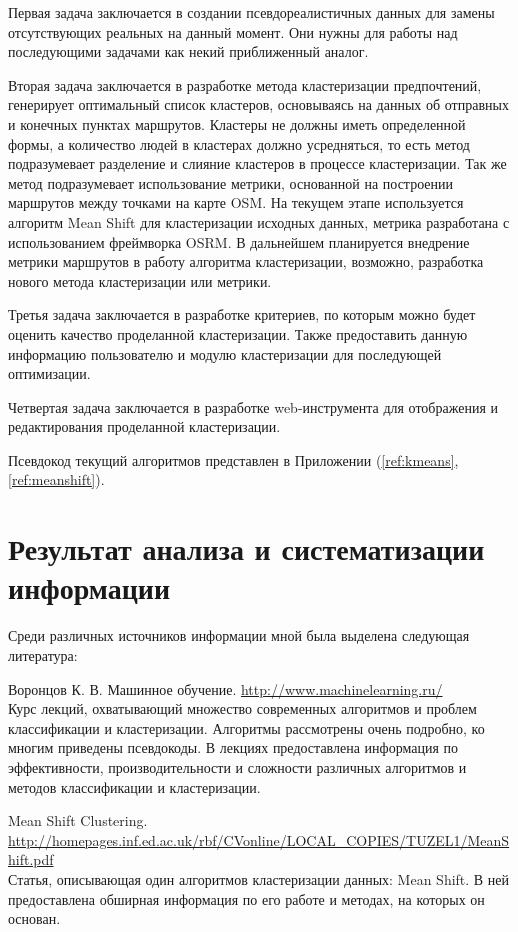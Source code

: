 Первая задача заключается в создании псевдореалистичных данных для замены отсутствующих реальных
на данный момент. Они нужны для работы над последующими задачами как некий приближенный аналог.

Вторая задача заключается в разработке метода кластеризации предпочтений, генерирует оптимальный
список кластеров, основываясь на данных об отправных и конечных пунктах маршрутов. Кластеры не
должны иметь определенной формы, а количество людей в кластерах должно усредняться, то есть метод
подразумевает разделение и слияние кластеров в процессе кластеризации. Так же метод подразумевает
использование метрики, основанной на построении маршрутов между точками на карте OSM.
На текущем этапе используется алгоритм Mean Shift для кластеризации исходных данных, метрика
разработана с использованием фреймворка OSRM. В дальнейшем планируется внедрение метрики маршрутов
в работу алгоритма кластеризации, возможно, разработка нового метода кластеризации или метрики.

Третья задача заключается в разработке критериев, по которым можно будет оценить качество
проделанной кластеризации. Также предоставить данную информацию пользователю и модулю кластеризации
для последующей оптимизации.

Четвертая задача заключается в разработке web-инструмента для отображения и редактирования
проделанной кластеризации.

Псевдокод текущий алгоритмов представлен в Приложении (\ref{ref:kmeans},
\ref{ref:meanshift}).

\chapter{Результат анализа и систематизации информации}
Среди различных источников информации мной была выделена следующая литература:

Воронцов К. В. Машинное обучение.
\url{http://www.machinelearning.ru/}\\
Курс лекций, охватывающий множество современных алгоритмов и проблем классификации и кластеризации.
Алгоритмы рассмотрены очень подробно, ко многим приведены псевдокоды. В лекциях предоставлена
информация по эффективности, производительности и сложности различных алгоритмов и методов
классификации и кластеризации.

Mean Shift Clustering.\\
{\small\url{http://homepages.inf.ed.ac.uk/rbf/CVonline/LOCAL_COPIES/TUZEL1/MeanShift.pdf}\\}
Статья, описывающая один алгоритмов кластеризации данных: Mean Shift. В ней предоставлена
обширная информация по его работе и методах, на которых он основан.

